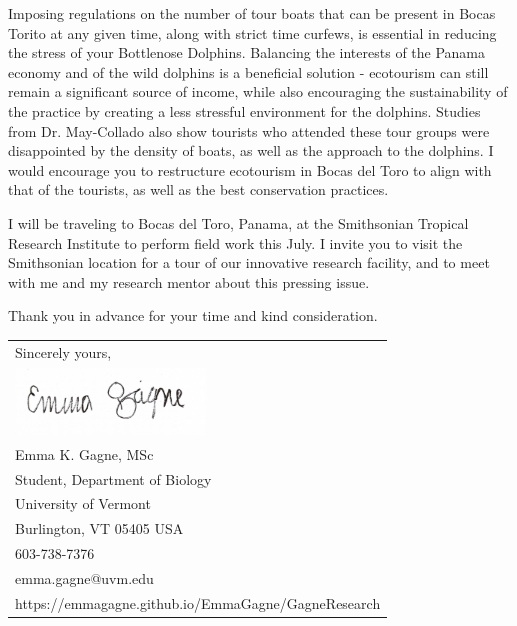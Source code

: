 \documentclass[10pt]{article}\usepackage[]{graphicx}\usepackage[]{color}
\begin{document}
Imposing regulations on the number of tour boats that can be present in Bocas Torito at any given time, along with strict time curfews, is essential in reducing the stress of your Bottlenose Dolphins. Balancing the interests of the Panama economy and of the wild dolphins is a beneficial solution -  ecotourism can still remain a significant source of income, while also encouraging the sustainability of the practice by creating a less stressful environment for the dolphins. Studies from Dr. May-Collado also show tourists who attended these tour groups were disappointed by the density of boats, as well as the approach to the dolphins. I would encourage you to restructure ecotourism in Bocas del Toro to align with that of the tourists, as well as the best conservation practices.

I will be traveling to Bocas del Toro, Panama, at the Smithsonian Tropical Research Institute to perform field work this July. I invite you to visit the Smithsonian location for a tour of our innovative research facility, and to meet with me and my research mentor about this pressing issue. 

Thank you in advance for your time and kind consideration.


\begin{tabular}{@{}l}
Sincerely yours,\\
\includegraphics[scale=0.15,width=2in]{MySignature.jpg}\\
Emma K. Gagne, MSc\\
Student, Department of Biology\\
University of Vermont\\
Burlington, VT 05405 USA\\
603-738-7376\\
emma.gagne@uvm.edu\\
https://emmagagne.github.io/EmmaGagne/GagneResearch\\
\end{tabular}
\end{document}
